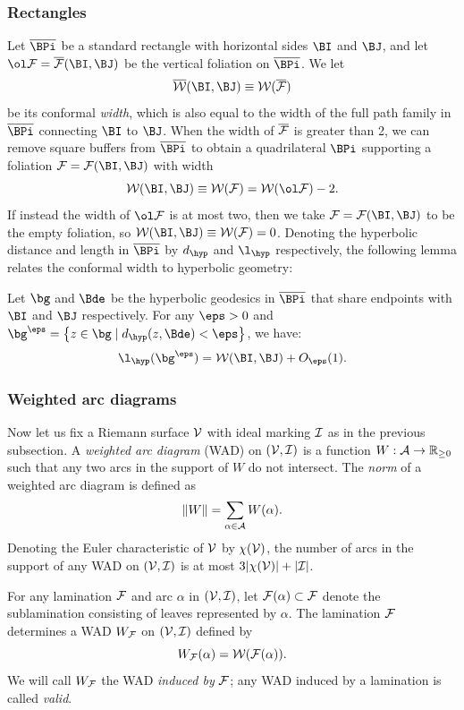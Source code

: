 \documentclass[12pt]{amsart}
\begin{document}
\subsubsection{Rectangles}
Let $\overline{\BPi}$ be a standard rectangle with horizontal sides $\BI$ and
$\BJ$, and let $\ol \FF= \overline{\FF}(\BI, \BJ)$ be the vertical foliation on $\overline{\BPi}$. We let 
$$
\overline{\WW}(\BI, \BJ)  \equiv {\WW}(\overline{\FF}) 
$$
be its conformal {\it width}, which is also equal to the width of the 
{full path family} in $\overline{\BPi}$ connecting $\BI$ to $\BJ$. 
When the width of $\overline{\mathcal F}$ is greater than 2, we can remove square buffers from $\overline{\BPi}$ to obtain a quadrilateral $\BPi$ supporting a foliation $\FF = \FF(\BI, \BJ)$ with width
$$
\WW(\BI, \BJ) \equiv 
\WW(\FF)  = \WW(\ol \FF) -2. 
$$
If instead the width of $\ol \FF$ is at most two, then we take $\FF= \FF(\BI, \BJ)$ to be the empty foliation, so $\WW(\BI, \BJ) \equiv \WW(\FF) = 0$.
Denoting the hyperbolic distance and length in $\overline{\BPi}$ by $d_\hyp$ and $\l_\hyp$ respectively, the following lemma relates the conformal width to hyperbolic geometry:
\begin{lem}\label{lem:hyp geo}
	Let $\bg$ and $\Bde$ be the hyperbolic geodesics in $\overline{\BPi}$ that share endpoints with $\BI$ and $\BJ$ respectively. For any $\eps>0$ and $\bg^\eps= \setofst{z\in\bg}{d_\hyp(z, \Bde)< \eps}$, we have:
	$$\l_\hyp(\bg^\eps)= \WW(\BI, \BJ)+O_\eps(1).$$
\end{lem}

\subsubsection{Weighted arc diagrams}\label{app:WAD}
Now let us fix a Riemann surface $\mathcal V$ with ideal marking $\mathcal I$
as in the previous subsection. 
A  \textit{weighted arc diagram}  (WAD) on $(\mathcal V, \mathcal I)$ is a function $W: \mathcal A\to \mathbb R_{\geq 0}$ such that any two arcs in the support of $W$ do not intersect.
The \textit{norm} of a weighted arc diagram is defined as 
$$\left\Vert W \right\Vert = \sum_{\alpha\in \mathcal A}W(\alpha).$$
Denoting the Euler characteristic of $\mathcal V$ by $\chi(\mathcal V)$, 
the number of arcs in the support of any WAD on $(\mathcal V, \mathcal I)$ is at most $3|\chi(\mathcal V)|+ |\mathcal I|$.


For any lamination $\mathcal F$ and arc $\alpha$ in $(\mathcal V, \mathcal I)$, let $\mathcal F(\alpha)\subset \mathcal F$ denote the sublamination consisting of leaves represented by $\alpha$. 
The lamination $\mathcal F$ determines a WAD $W_\mathcal F$ on $(\mathcal V, \mathcal I)$ defined by
$$W_\mathcal F(\alpha) = \mathcal W(\mathcal F(\alpha)).$$
We will call $W_\mathcal F$ the WAD \textit{induced by} $\mathcal F$; any WAD induced by a lamination is called \textit{valid}.
\end{document}
